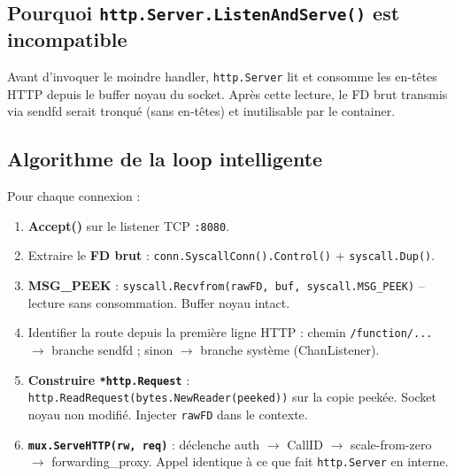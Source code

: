 \documentclass[11pt,a4paper]{article}
\begin{document}
\subsection{Pourquoi \texttt{http.Server.ListenAndServe()} est incompatible}

Avant d'invoquer le moindre handler, \texttt{http.Server} lit et consomme les en-têtes HTTP
depuis le buffer noyau du socket. Après cette lecture, le FD brut transmis via sendfd serait
tronqué (sans en-têtes) et inutilisable par le container.

\subsection{Algorithme de la loop intelligente}

Pour chaque connexion :
\begin{enumerate}[label=\textbf{Étape \arabic*:}, leftmargin=*]
  \item \textbf{Accept()} sur le listener TCP \texttt{:8080}.
  \item Extraire le \textbf{FD brut} : \texttt{conn.SyscallConn().Control()} +
    \texttt{syscall.Dup()}.
  \item \textbf{MSG\_PEEK} : \texttt{syscall.Recvfrom(rawFD, buf, syscall.MSG\_PEEK)} -- lecture
    sans consommation. Buffer noyau intact.
  \item Identifier la route depuis la première ligne HTTP :
    chemin \texttt{/function/...} $\to$ branche sendfd ;
    sinon $\to$ branche système (ChanListener).
  \item \textbf{Construire \texttt{*http.Request}} : \texttt{http.ReadRequest(bytes.NewReader(peeked))}
    sur la copie peekée. Socket noyau non modifié. Injecter \texttt{rawFD} dans le contexte.
  \item \textbf{\texttt{mux.ServeHTTP(rw, req)}} : déclenche auth $\to$ CallID $\to$
    scale-from-zero $\to$ forwarding\_proxy. Appel identique à ce que fait \texttt{http.Server}
    en interne.
\end{enumerate}

\end{document}
